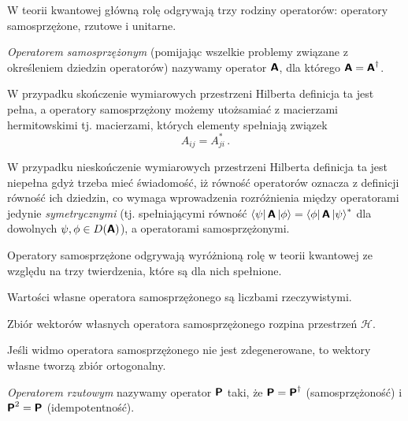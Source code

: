 \documentclass{myclass}
\begin{document}
W teorii kwantowej główną rolę odgrywają trzy rodziny operatorów: operatory samosprzężone, rzutowe i
unitarne.

\linesep

\begin{definition}
    \textit{Operatorem samosprzężonym} (pomijając wszelkie problemy związane z określeniem dziedzin
    operatorów) nazywamy operator \(\boldsymbol{\mathsf{A}}\), dla którego \(\boldsymbol{\mathsf{A}} = \boldsymbol{\mathsf{A}}^\dagger\).
\end{definition}

W przypadku skończenie wymiarowych przestrzeni Hilberta definicja ta jest pełna, a operatory
samosprzężony możemy utożsamiać z macierzami hermitowskimi tj. macierzami, których elementy
spełniają związek
\begin{equation*}
    A_{ij} = A_{ji}^*\,.
\end{equation*}

W przypadku nieskończenie wymiarowych przestrzeni Hilberta definicja ta jest niepełna gdyż trzeba
mieć świadomość, iż równość operatorów oznacza z definicji równość ich dziedzin, co wymaga
wprowadzenia rozróżnienia między operatorami jedynie \textit{symetrycznymi} (tj. spełniającymi
równość \(\bra{\psi}\boldsymbol{\mathsf{A}}\ket{\phi} = \bra{\phi}\boldsymbol{\mathsf{A}}\ket{\psi}^*\) dla dowolnych
\(\psi,\phi\in D(\boldsymbol{\mathsf{A}})\)), a operatorami samosprzężonymi.

Operatory samosprzężone odgrywają wyróżnioną rolę w teorii kwantowej ze względu na trzy twierdzenia,
które są dla nich spełnione.

\begin{theorem}
Wartości własne operatora samosprzężonego są liczbami rzeczywistymi.   
\end{theorem}

\begin{theorem}
Zbiór wektorów własnych operatora samosprzężonego rozpina przestrzeń \(\mathscr{H}\).   
\end{theorem}

\begin{theorem}
Jeśli widmo operatora samosprzężonego nie jest zdegenerowane, to wektory własne tworzą zbiór
ortogonalny.
\end{theorem}

\linesep

\begin{definition}
\textit{Operatorem rzutowym} nazywamy operator \(\boldsymbol{\mathsf{P}}\) taki, że \(\boldsymbol{\mathsf{P}} = \boldsymbol{\mathsf{P}}^\dagger\)
(samosprzężoność) i \(\boldsymbol{\mathsf{P}}^2 = \boldsymbol{\mathsf{P}}\) (idempotentność). 
\end{definition}
\end{document}
